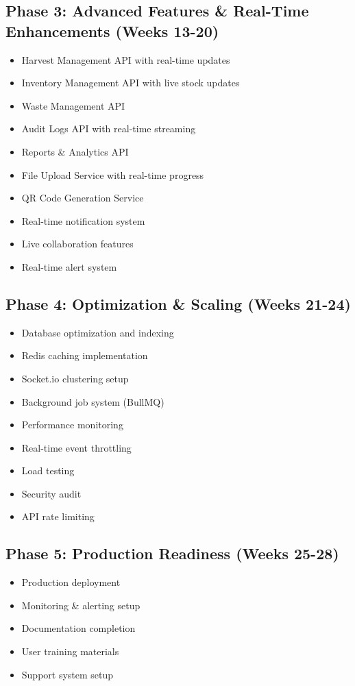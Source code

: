 \documentclass[11pt,a4paper]{article}
\begin{document}
\subsection{Phase 3: Advanced Features \& Real-Time Enhancements (Weeks 13-20)}
\begin{itemize}
    \item[$\square$] Harvest Management API with real-time updates
    \item[$\square$] Inventory Management API with live stock updates
    \item[$\square$] Waste Management API
    \item[$\square$] Audit Logs API with real-time streaming
    \item[$\square$] Reports \& Analytics API
    \item[$\square$] File Upload Service with real-time progress
    \item[$\square$] QR Code Generation Service
    \item[$\square$] Real-time notification system
    \item[$\square$] Live collaboration features
    \item[$\square$] Real-time alert system
\end{itemize}

\subsection{Phase 4: Optimization \& Scaling (Weeks 21-24)}
\begin{itemize}
    \item[$\square$] Database optimization and indexing
    \item[$\square$] Redis caching implementation
    \item[$\square$] Socket.io clustering setup
    \item[$\square$] Background job system (BullMQ)
    \item[$\square$] Performance monitoring
    \item[$\square$] Real-time event throttling
    \item[$\square$] Load testing
    \item[$\square$] Security audit
    \item[$\square$] API rate limiting
\end{itemize}

\subsection{Phase 5: Production Readiness (Weeks 25-28)}
\begin{itemize}
    \item[$\square$] Production deployment
    \item[$\square$] Monitoring \& alerting setup
    \item[$\square$] Documentation completion
    \item[$\square$] User training materials
    \item[$\square$] Support system setup
\end{itemize}
\end{document}
